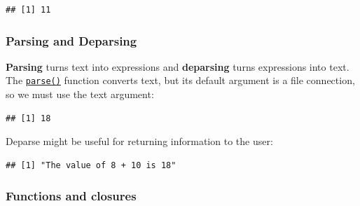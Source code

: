 \documentclass[]{book}
\newenvironment{Shaded}{\begin{snugshade}}{\end{snugshade}}
\newcommand{\ControlFlowTok}[1]{\textcolor[rgb]{0.13,0.29,0.53}{\textbf{#1}}}
\newcommand{\DataTypeTok}[1]{\textcolor[rgb]{0.13,0.29,0.53}{#1}}
\newcommand{\DecValTok}[1]{\textcolor[rgb]{0.00,0.00,0.81}{#1}}
\newcommand{\KeywordTok}[1]{\textcolor[rgb]{0.13,0.29,0.53}{\textbf{#1}}}
\newcommand{\NormalTok}[1]{#1}
\newcommand{\OperatorTok}[1]{\textcolor[rgb]{0.81,0.36,0.00}{\textbf{#1}}}
\newcommand{\StringTok}[1]{\textcolor[rgb]{0.31,0.60,0.02}{#1}}
\begin{document}
\begin{verbatim}
## [1] 11
\end{verbatim}

\hypertarget{parsing-and-deparsing}{%
\subsubsection{Parsing and Deparsing}\label{parsing-and-deparsing}}

\textbf{Parsing} turns text into expressions and \textbf{deparsing} turns expressions into text.
The \href{https://www.rdocumentation.org/packages/base/topics/parse}{\texttt{parse()}} function
converts text, but its default argument is a file connection, so we must use the text
argument:

\begin{Shaded}
\end{Shaded}

\begin{verbatim}
## [1] 18
\end{verbatim}

Deparse might be useful for returning information to the user:

\begin{Shaded}
\end{Shaded}

\begin{verbatim}
## [1] "The value of 8 + 10 is 18"
\end{verbatim}

\hypertarget{functions-and-closures}{%
\subsubsection{Functions and closures}\label{functions-and-closures}}
\end{document}
